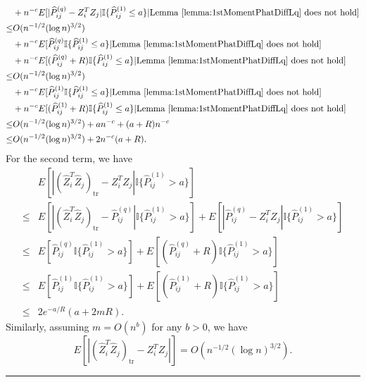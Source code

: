 \documentclass[a4paper]{article}
\newenvironment{proof}{{\bf Proof:  }}{\hfill\rule{2mm}{2mm}}
\renewcommand{\hat}{\widehat}
\begin{document}
\begin{proof}
\begin{align*}
	& + n^{-c} E[|\hat{P}^{(q)}_{ij} - Z_i^T Z_j| \mathbb{I}\{\hat{P}^{(1)}_{ij} \le a\} | \mathrm{Lemma\ } \ref{lemma:1stMomentPhatDiffLq} \mathrm{\ does\ not\ hold}] \\
	\le & O(n^{-1/2} (\log n)^{3/2}) \\
	& + n^{-c} E[\hat{P}^{(q)}_{ij} \mathbb{I}\{\hat{P}^{(1)}_{ij} \le a\} | \mathrm{Lemma\ } \ref{lemma:1stMomentPhatDiffLq} \mathrm{\ does\ not\ hold}] \\
	& + n^{-c} E[(\hat{P}^{(q)}_{ij} + R) \mathbb{I}\{\hat{P}^{(1)}_{ij} \le a\} | \mathrm{Lemma\ } \ref{lemma:1stMomentPhatDiffLq} \mathrm{\ does\ not\ hold}] \\
	\le & O(n^{-1/2} (\log n)^{3/2}) \\
	& + n^{-c} E[\hat{P}^{(1)}_{ij} \mathbb{I}\{\hat{P}^{(1)}_{ij} \le a\} | \mathrm{Lemma\ } \ref{lemma:1stMomentPhatDiffLq} \mathrm{\ does\ not\ hold}] \\
	& + n^{-c} E[(\hat{P}^{(1)}_{ij} + R) \mathbb{I}\{\hat{P}^{(1)}_{ij} \le a\} | \mathrm{Lemma\ } \ref{lemma:1stMomentPhatDiffLq} \mathrm{\ does\ not\ hold}] \\
	\le & O(n^{-1/2} (\log n)^{3/2}) + a n^{-c} + (a+R) n^{-c} \\
	\le & O(n^{-1/2} (\log n)^{3/2}) + 2 n^{-c} (a + R).
\end{align*}
For the second term, we have
\begin{align*}
	& E[|(\hat{Z}_i^T \hat{Z}_j)_{\mathrm{tr}} - Z_i^T Z_j| \mathbb{I}\{\hat{P}^{(1)}_{ij} > a\}] \\
	\le & E[|(\hat{Z}_i^T \hat{Z}_j)_{\mathrm{tr}} - \hat{P}^{(q)}_{ij}| \mathbb{I}\{\hat{P}^{(1)}_{ij} > a\}] + E[|\hat{P}^{(q)}_{ij} - Z_i^T Z_j| \mathbb{I}\{\hat{P}^{(1)}_{ij} > a\}] \\
	\le & E[\hat{P}^{(q)}_{ij} \mathbb{I}\{\hat{P}^{(1)}_{ij} > a\}] + E[(\hat{P}^{(q)}_{ij} + R) \mathbb{I}\{\hat{P}^{(1)}_{ij} > a\}] \\
	\le & E[\hat{P}^{(1)}_{ij} \mathbb{I}\{\hat{P}^{(1)}_{ij} > a\}] + E[(\hat{P}^{(1)}_{ij} + R) \mathbb{I}\{\hat{P}^{(1)}_{ij} > a\}] \\
	\le & 2 e^{-a/R} (a + 2 m R).
\end{align*}
Similarly, assuming $m = O(n^b)$ for any $b > 0$, we have
\[
E[|(\hat{Z}_i^T \hat{Z}_j)_{\mathrm{tr}} - Z_i^T Z_j|] = O(n^{-1/2} (\log n)^{3/2}).
\]
\end{proof}
\end{document}
